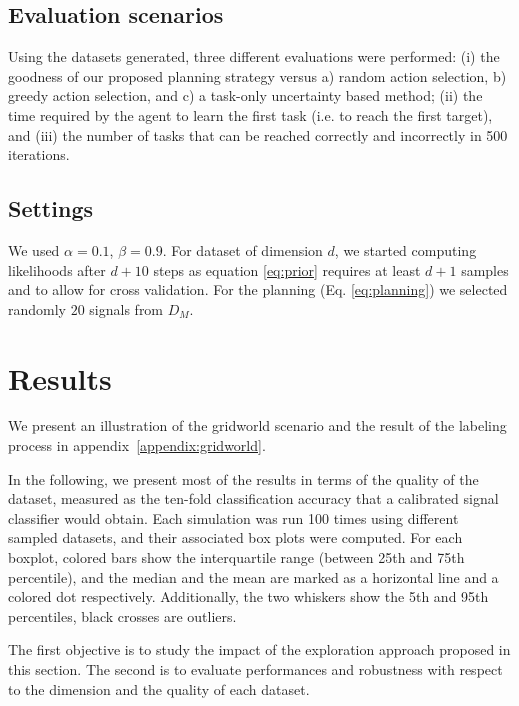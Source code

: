 \subsection{Evaluation scenarios}

Using the datasets generated, three different evaluations were performed: (i) the goodness of our proposed planning strategy versus a) random action selection, b) greedy action selection, and c) a task-only uncertainty based method; (ii) the time required by the agent to learn the first task (i.e. to reach the first target), and (iii) the number of tasks that can be reached correctly and incorrectly in 500 iterations.

\subsection{Settings}

We used $\alpha = 0.1$, $\beta = 0.9$. For dataset of dimension $d$, we started computing likelihoods after $d+10$ steps as equation \ref{eq:prior} requires at least $d+1$ samples and to allow for cross validation. For the planning (Eq. \ref{eq:planning}) we selected randomly $20$ signals from $D_M$.


\section{Results}

We present an illustration of the gridworld scenario and the result of the labeling process in appendix~\ref{appendix:gridworld}.

In the following, we present most of the results in terms of the quality of the dataset, measured as the ten-fold classification accuracy that a calibrated signal classifier would obtain. Each simulation was run 100 times using different sampled datasets, and their associated box plots were computed. For each boxplot, colored bars show the interquartile range (between 25th and 75th percentile), and the median and the mean are marked as a horizontal line and a colored dot respectively. Additionally, the two whiskers show the 5th and 95th percentiles, black crosses are outliers. 

The first objective is to study the impact of the exploration approach proposed in this section. The second is to evaluate performances and robustness with respect to the dimension and the quality of each dataset.

